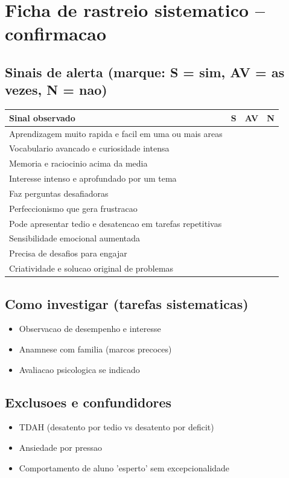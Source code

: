\documentclass[a4paper,11pt]{book}
\begin{document}
\section*{Ficha de rastreio sistematico -- confirmacao}
\subsection*{Sinais de alerta (marque: S = sim, AV = as vezes, N = nao)}
\begin{tabular}{@{}p{11.5cm}ccc@{}}\toprule
Sinal observado & S & AV & N \\\midrule
Aprendizagem muito rapida e facil em uma ou mais areas & & & \\
Vocabulario avancado e curiosidade intensa & & & \\
Memoria e raciocinio acima da media & & & \\
Interesse intenso e aprofundado por um tema & & & \\
Faz perguntas desafiadoras & & & \\
Perfeccionismo que gera frustracao & & & \\
Pode apresentar tedio e desatencao em tarefas repetitivas & & & \\
Sensibilidade emocional aumentada & & & \\
Precisa de desafios para engajar & & & \\
Criatividade e solucao original de problemas & & & \\
\bottomrule\end{tabular}
\subsection*{Como investigar (tarefas sistematicas)}
\begin{itemize}
\item Observacao de desempenho e interesse
\item Anamnese com familia (marcos precoces)
\item Avaliacao psicologica se indicado
\end{itemize}
\subsection*{Exclusoes e confundidores}
\begin{itemize}
\item TDAH (desatento por tedio vs desatento por deficit)
\item Ansiedade por pressao
\item Comportamento de aluno 'esperto' sem excepcionalidade
\end{itemize}
\end{document}
